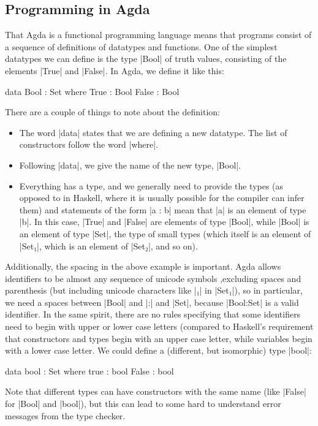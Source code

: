 \subsection{Programming in Agda}
That Agda is a functional programming language means that programs consist of a sequence of definitions of datatypes and functions. One of the simplest datatypes we can define is the type |Bool| of truth values, consisting of the elements |True| and |False|. In Agda, we define it like this:
\begin{code}
data Bool : Set where
  True   : Bool
  False  : Bool
\end{code}
There are a couple of things to note about the definition:
\begin{itemize}
\item The word |data| states that we are defining a new datatype. The list of constructors follow the word |where|. 
\item Following |data|, we give the name of the new type, |Bool|.
\item Everything has a type, and we generally need to provide the types (as opposed to in Haskell, where it is usually possible for the compiler can infer them) and statements of the form |a : b| mean that |a| is an element of type |b|. In this case, |True| and |False| are elements of type |Bool|, while |Bool| is an element of type |Set|, the type of small types (which itself is an element of |Set₁|, which is an element of |Set₂|, and so on).
\end{itemize}
Additionally, the spacing in the above example is important. Agda allows identifiers to be almost any sequence of unicode symbols ,excluding spaces and parenthesis (but including unicode characters like |₁| in |Set₁|), so in particular, we need a spaces  between |Bool| and |:| and |Set|, because |Bool:Set| is a valid identifier. In the same spirit, there are no rules specifying that some identifiers need to begin with upper or lower case letters (compared to Haskell's requirement that constructors and types begin with an upper case letter, while variables begin with a lower case letter. We could define a (different, but isomorphic) type |bool|:
\begin{code}
data bool : Set where
  true  : bool
  False : bool
\end{code}
Note that different types can have constructors with the same name (like |False| for |Bool| and |bool|), but this can lead to some hard to understand error messages from the type checker.

